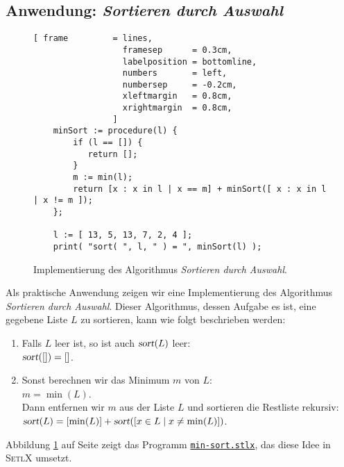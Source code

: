 \subsection{Anwendung: \emph{Sortieren durch Auswahl}}
\begin{figure}[!ht]
\centering
\begin{Verbatim}[ frame         = lines, 
                  framesep      = 0.3cm, 
                  labelposition = bottomline,
                  numbers       = left,
                  numbersep     = -0.2cm,
                  xleftmargin   = 0.8cm,
                  xrightmargin  = 0.8cm,
                ]
    minSort := procedure(l) {
        if (l == []) {
           return [];
        }
        m := min(l);
        return [x : x in l | x == m] + minSort([ x : x in l | x != m ]);
    };

    l := [ 13, 5, 13, 7, 2, 4 ];
    print( "sort( ", l, " ) = ", minSort(l) );
\end{Verbatim}
\vspace*{-0.3cm}
\caption{Implementierung des Algorithmus \emph{Sortieren durch Auswahl}.}
\label{fig:min-sort.stlx}
\end{figure}

\noindent
Als praktische Anwendung zeigen wir eine Implementierung des Algorithmus 
\emph{Sortieren durch Auswahl}.  Dieser Algorithmus, dessen Aufgabe es ist, eine gegebene
Liste $L$ zu sortieren, kann wie folgt beschrieben werden:
\begin{enumerate}
\item Falls $L$ leer ist, so ist auch $\textsl{sort}(L)$ leer:
      \\[0.2cm]
      \hspace*{1.3cm}
      $\textsl{sort}([]) = []$.
\item Sonst berechnen wir das Minimum $m$ von $L$: 
      \\[0.2cm]
      \hspace*{1.3cm}
      $m = \min(L)$.
      \\[0.2cm]
      Dann entfernen wir $m$ aus der Liste $L$ und sortieren die Restliste rekursiv:
      \\[0.2cm]
      \hspace*{1.3cm}
      $\textsl{sort}(L) = [ \min(L) ] + \textsl{sort}([ x \in L \mid x \not= \min(L) ])$.
\end{enumerate}
Abbildung \ref{fig:min-sort.stlx} auf Seite \pageref{fig:min-sort.stlx} zeigt das Programm
\href{https://github.com/karlstroetmann/Logik/blob/master/SetlX/min-sort.stlx}{\texttt{min-sort.stlx}},
das diese Idee in \textsc{SetlX} umsetzt. 


